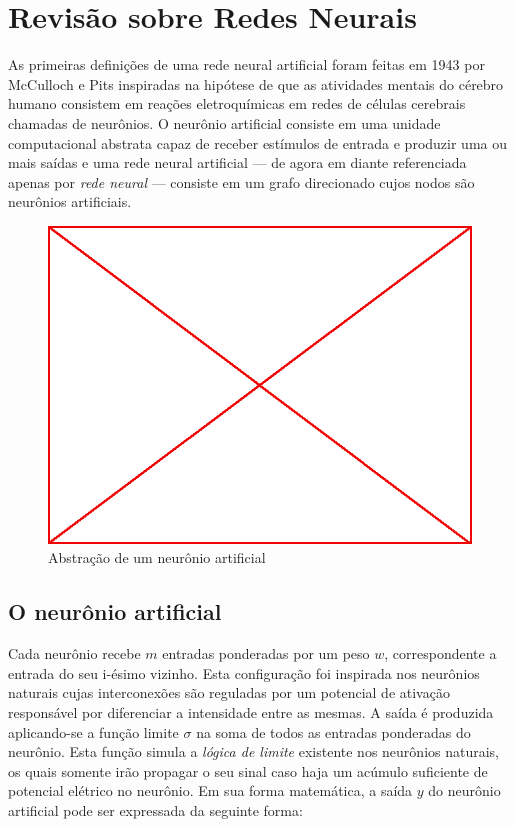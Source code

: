 

\chapter{Revisão sobre Redes Neurais}

As primeiras definições de uma rede neural artificial foram feitas em 1943 por
McCulloch e Pits inspiradas na hipótese de que as atividades mentais do cérebro
humano consistem em reações eletroquímicas em redes de células cerebrais
chamadas de neurônios. O neurônio artificial consiste em uma unidade
computacional abstrata capaz de receber estímulos de entrada e produzir uma ou
mais saídas e uma rede neural artificial --- de agora em diante referenciada
apenas por \emph{rede neural} --- consiste em um grafo direcionado cujos nodos
são neurônios artificiais.

\begin{figure}
  \caption{Abstração de um neurônio artificial}
  \begin{center}
    \includegraphics[scale=0.5]{placeholder}
  \end{center}
\end{figure}

\section{O neurônio artificial}

Cada neurônio recebe $m$ entradas ponderadas por um peso $w$,
correspondente a entrada do seu i-ésimo vizinho. Esta configuração foi
inspirada nos neurônios naturais cujas interconexões são reguladas por um
potencial de ativação responsável por diferenciar a intensidade entre as
mesmas. A saída é produzida aplicando-se a função limite $\sigma$ na soma
de todos as entradas ponderadas do neurônio. Esta função simula a \emph{lógica
  de limite} existente nos neurônios naturais, os quais somente irão propagar o
seu sinal caso haja um acúmulo suficiente de potencial elétrico no neurônio. Em
sua forma matemática, a saída $y$ do neurônio artificial pode ser expressada da
seguinte forma:

